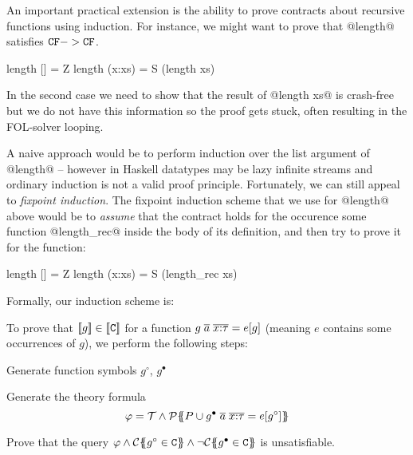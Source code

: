 \label{sect:induction}

An important practical extension is the ability to prove contracts about recursive functions
using induction. For instance, we might want to prove that @length@ satisfies ${\tt CF} -> {\tt CF}$.
\begin{code}
  length []     = Z 
  length (x:xs) = S (length xs)
\end{code}
In the second case we need to show that the result of @length xs@ is crash-free but we do not 
have this information so the proof gets stuck, often resulting in the FOL-solver looping. 

A naive approach would be to perform induction over the list argument of @length@ -- however
in Haskell datatypes may be lazy infinite streams and ordinary induction is not
a valid proof principle. Fortunately, we can still appeal to {\em fixpoint induction}. The 
fixpoint induction scheme that we use for @length@ above would be to {\em assume} that the 
contract holds for the occurence some function @length_rec@ inside the body of its definition, 
and then try to prove it for the function:
\begin{code}
  length []     = Z 
  length (x:xs) = S (length_rec xs)
\end{code}

Formally, our induction scheme is:
\begin{definition}\label{def:induction}
To prove that $[\![g]\!] \in [\![{\tt C}]\!]$ for a function 
$g\;\overline{a}\;\overline{x{:}\tau} = e[g]$ (meaning $e$ contains
some occurrences of $g$), we perform the following steps:
\begin{itemize*}
  \item Generate function symbols $g^{\circ}$, $g^{\bullet}$
  \item Generate the theory formula \[ \varphi = {\cal T} \land 
             {\cal P}\{\!\!\{P \cup g^{\bullet}\;\overline{a}\;\overline{x{:}\tau} = e[g^{\circ}]\}\!\!\} \] 
  \item Prove that the query $\phi \land \ctrans{}{}{g^{\circ} \in \Ct} \land \neg \ctrans{}{}{g^{\bullet} \in \Ct}$
        is unsatisfiable.
\end{itemize*}
\end{definition}

